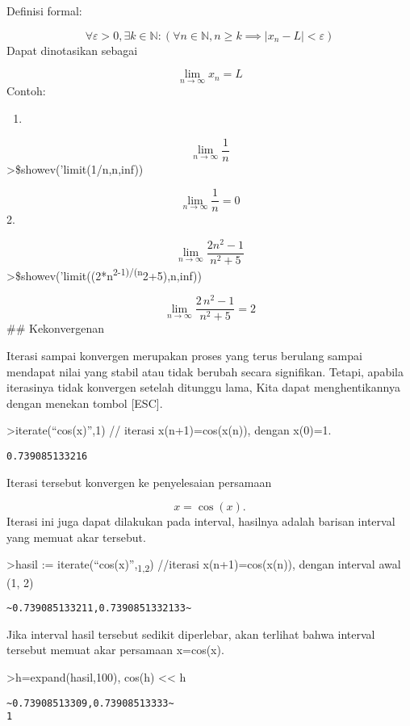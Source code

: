 \documentclass[
]{book}
\providecommand{\tightlist}{%
  \setlength{\itemsep}{0pt}\setlength{\parskip}{0pt}}
\begin{document}
Definisi formal:

\[\forall \varepsilon > 0, \exists k \in \mathbb{N} : (\forall n \in \mathbb{N}, n \geq k \implies |x_n - L| <\varepsilon)\]Dapat dinotasikan sebagai

\[\lim_{n\to\infty}x_n=L\]Contoh:

\begin{enumerate}
\def\labelenumi{\arabic{enumi}.}
\tightlist
\item
\end{enumerate}

\[\lim_{n \to \infty}\frac{1}{n}\]\textgreater\$showev('limit(1/n,n,inf))

\[\lim_{n\rightarrow \infty }{\frac{1}{n}}=0\]2.

\[\lim_{n\to\infty}\frac{2n^2-1}{n^2+5}\]\textgreater\$showev('limit((2*n\textsuperscript{2-1)/(n}2+5),n,inf))

\[\lim_{n\rightarrow \infty }{\frac{2\,n^2-1}{n^2+5}}=2\]\#\# Kekonvergenan

Iterasi sampai konvergen merupakan proses yang terus berulang sampai mendapat nilai yang stabil atau tidak berubah secara signifikan. Tetapi, apabila iterasinya tidak konvergen setelah ditunggu lama, Kita dapat menghentikannya dengan menekan tombol {[}ESC{]}.

\textgreater iterate(``cos(x)'',1) // iterasi x(n+1)=cos(x(n)), dengan x(0)=1.

\begin{verbatim}
0.739085133216
\end{verbatim}

Iterasi tersebut konvergen ke penyelesaian persamaan

\[x = \cos(x).\]Iterasi ini juga dapat dilakukan pada interval, hasilnya adalah barisan interval yang memuat akar tersebut.

\textgreater hasil := iterate(``cos(x)'',\textsubscript{1,2}) //iterasi x(n+1)=cos(x(n)), dengan interval awal (1, 2)

\begin{verbatim}
~0.739085133211,0.7390851332133~
\end{verbatim}

Jika interval hasil tersebut sedikit diperlebar, akan terlihat bahwa interval tersebut memuat akar persamaan x=cos(x).

\textgreater h=expand(hasil,100), cos(h) \textless\textless{} h

\begin{verbatim}
~0.73908513309,0.73908513333~
1
\end{verbatim}
\end{document}
